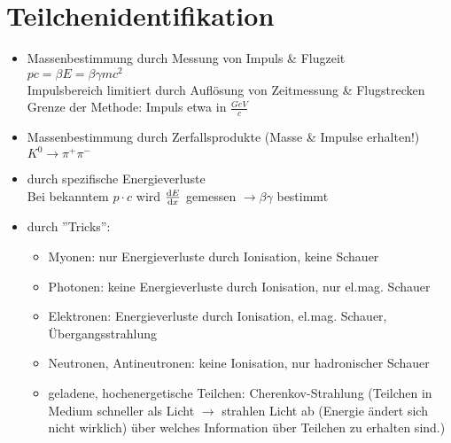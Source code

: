 \documentclass[Ex4_Zusammenfassung.tex]{subfiles}
\begin{document}
\section{Teilchenidentifikation}
\begin{itemize}
	\item Massenbestimmung durch Messung von Impuls \& Flugzeit\\
		$pc = \beta E = \beta \gamma m c^2$\\
		Impulsbereich limitiert durch Auflösung von Zeitmessung \& Flugstrecken\\
		Grenze der Methode: Impuls etwa in $\frac{\si{GeV}}{c}$
	\item Massenbestimmung durch Zerfallsprodukte (Masse \& Impulse erhalten!)\\
		$K^0 \rightarrow \pi^+ \pi^-$
	\item durch spezifische Energieverluste\\
		Bei bekanntem $p\cdot c$ wird $\frac{\mathrm{d} E}{\mathrm{d} x}$ gemessen $\rightarrow \beta \gamma$ bestimmt
	\item durch ''Tricks'':
		\begin{itemize}
			\item Myonen: nur Energieverluste durch Ionisation, keine Schauer
			\item Photonen: keine Energieverluste durch Ionisation, nur el.mag. Schauer
			\item Elektronen: Energieverluste durch Ionisation, el.mag. Schauer, Übergangsstrahlung
			\item Neutronen, Antineutronen: keine Ionisation, nur hadronischer Schauer
			\item geladene, hochenergetische Teilchen: Cherenkov-Strahlung (Teilchen in Medium schneller als Licht $\rightarrow$ strahlen Licht ab (Energie ändert sich nicht wirklich) über welches Information über Teilchen zu erhalten sind.)
		\end{itemize} 
\end{itemize}
\end{document}
